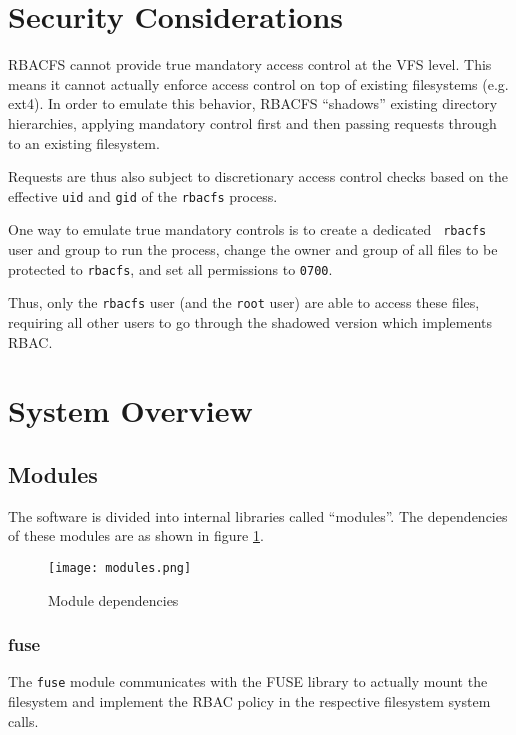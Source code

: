 \documentclass[11pt,oneside,letterpaper]{article}
\begin{document}
\section{Security Considerations}

RBACFS cannot provide true mandatory access control at the VFS level. This
means it cannot actually enforce access control on top of existing filesystems
(e.g. ext4). In order to emulate this behavior, RBACFS ``shadows'' existing
directory hierarchies, applying mandatory control first and then passing
requests through to an existing filesystem.

Requests are thus also subject to discretionary access control checks
based on the effective {\tt uid} and {\tt gid} of the {\tt rbacfs} process.

One way to emulate true mandatory controls is to create a dedicated {\tt
rbacfs} user and group to run the process, change the owner and group of all
files to be protected to {\tt rbacfs}, and set all permissions to {\tt 0700}.

Thus, only the {\tt rbacfs} user (and the {\tt root} user) are able
to access these files, requiring all other users to go through the
shadowed version which implements RBAC.

\section{System Overview}

\subsection{Modules}

The software is divided into internal libraries called ``modules''. The
dependencies of these modules are as shown in figure \ref{fig:modules}.

\begin{figure}[h]
    \centering
    \texttt{[image: modules.png]}
    \label{fig:modules}
    \caption{Module dependencies}
\end{figure}

\subsubsection{fuse}

The {\tt fuse} module communicates with the FUSE library to actually mount
the filesystem and implement the RBAC policy in the respective filesystem
system calls.
\end{document}
